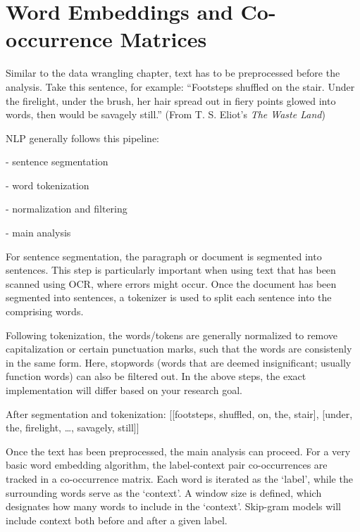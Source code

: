 \section{Word Embeddings and Co-occurrence Matrices}

Similar to the data wrangling chapter, text has to be preprocessed before the analysis. Take this sentence, for example: ``Footsteps shuffled on the stair. Under the firelight, under the brush, her hair spread out in fiery points glowed into words, then would be savagely still.'' (From T. S. Eliot's \textit{The Waste Land})

NLP generally follows this pipeline: 

- sentence segmentation

- word tokenization

- normalization and filtering

- main analysis


For sentence segmentation, the paragraph or document is segmented into sentences. This step is particularly important when using text that has been scanned using OCR, where errors might occur.
Once the document has been segmented into sentences, a tokenizer is used to split each sentence into the comprising words. 

Following tokenization, the words/tokens are generally normalized to remove capitalization or certain punctuation marks, such that the words are consistenly in the same form.
Here, stopwords (words that are deemed insignificant; usually function words) can also be filtered out.
In the above steps, the exact implementation will differ based on your research goal.


After segmentation and tokenization: 
[[footsteps, shuffled, on, the, stair], 
[under, the, firelight, \dots, savagely, still]]

Once the text has been preprocessed, the main analysis can proceed. For a very basic word embedding algorithm, the label-context pair co-occurrences are tracked in a co-occurrence matrix.
Each word is iterated as the `label', while the surrounding words serve as the `context'. A window size is defined, which designates how many words to include in the `context'. Skip-gram models will include context both before and after a given label.

